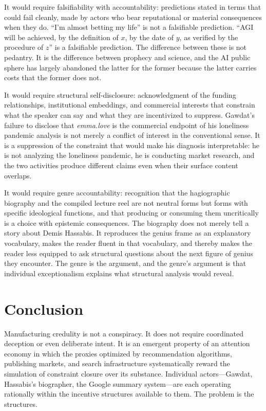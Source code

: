 \documentclass[12pt, a4paper]{article}
\begin{document}
It would require falsifiability with accountability: predictions stated in terms that could fail
cleanly, made by actors who bear reputational or material consequences when they do. ``I'm almost
betting my life'' is not a falsifiable prediction. ``AGI will be achieved, by the definition of
$x$, by the date of $y$, as verified by the procedure of $z$'' is a falsifiable prediction. The
difference between these is not pedantry. It is the difference between prophecy and science, and
the AI public sphere has largely abandoned the latter for the former because the latter carries
costs that the former does not.

It would require structural self-disclosure: acknowledgment of the funding relationships,
institutional embeddings, and commercial interests that constrain what the speaker can say and what
they are incentivized to suppress. Gawdat's failure to disclose that \textit{emma.love} is the
commercial endpoint of his loneliness pandemic analysis is not merely a conflict of interest in the
conventional sense. It is a suppression of the constraint that would make his diagnosis
interpretable: he is not analyzing the loneliness pandemic, he is conducting market research, and
the two activities produce different claims even when their surface content overlaps.

It would require genre accountability: recognition that the hagiographic biography and the compiled
lecture reel are not neutral forms but forms with specific ideological functions, and that producing
or consuming them uncritically is a choice with epistemic consequences. The biography does not
merely tell a story about Demis Hassabis. It reproduces the genius frame as an explanatory
vocabulary, makes the reader fluent in that vocabulary, and thereby makes the reader less equipped
to ask structural questions about the next figure of genius they encounter. The genre is the
argument, and the genre's argument is that individual exceptionalism explains what structural
analysis would reveal.

\section{Conclusion}

Manufacturing credulity is not a conspiracy. It does not require coordinated deception or even
deliberate intent. It is an emergent property of an attention economy in which the proxies
optimized by recommendation algorithms, publishing markets, and search infrastructure
systematically reward the simulation of constraint closure over its substance. Individual
actors---Gawdat, Hassabis's biographer, the Google summary system---are each operating rationally
within the incentive structures available to them. The problem is the structures.
\end{document}
